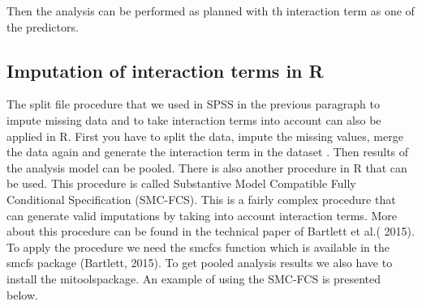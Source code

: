 \documentclass[]{book}
\newenvironment{Shaded}{\begin{snugshade}}{\end{snugshade}}
\newcommand{\CommentTok}[1]{\textcolor[rgb]{0.56,0.35,0.01}{\textit{#1}}}
\theoremstyle{definition}
\theoremstyle{definition}
\theoremstyle{definition}
\theoremstyle{remark}
\begin{document}
Then the analysis can be performed as planned with th interaction term
as one of the predictors.

\subsection{Imputation of interaction terms in
R}\label{imputation-of-interaction-terms-in-r}

The split file procedure that we used in SPSS in the previous paragraph
to impute missing data and to take interaction terms into account can
also be applied in R. First you have to split the data, impute the
missing values, merge the data again and generate the interaction term
in the dataset . Then results of the analysis model can be pooled. There
is also another procedure in R that can be used. This procedure is
called Substantive Model Compatible Fully Conditional Specification
(SMC-FCS). This is a fairly complex procedure that can generate valid
imputations by taking into account interaction terms. More about this
procedure can be found in the technical paper of Bartlett et al.( 2015).
To apply the procedure we need the smcfcs function which is available in
the smcfs package (Bartlett, 2015). To get pooled analysis results we
also have to install the mitoolspackage. An example of using the SMC-FCS
is presented below.

\begin{Shaded}
\end{Shaded}
\end{document}
